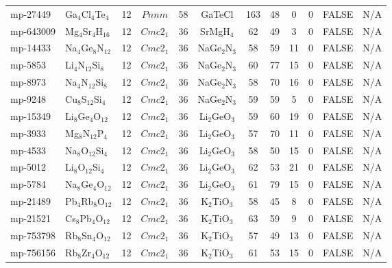 {\begin{longtable}{llcccccccccc}
    mp-27449 & Ga$_{4}$Cl$_{4}$Te$_{4}$ & 12    & $Pnnm$ & 58    & GaTeCl & 163   & 48    & 0     & 0     & FALSE & N/A \\
    mp-643009 & Mg$_{4}$Sr$_{4}$H$_{16}$ & 12    & $Cmc2_1$ & 36    & SrMgH$_{4}$ & 62    & 49    & 3     & 0     & FALSE & N/A \\
    mp-14433 & Na$_{4}$Ge$_{8}$N$_{12}$ & 12    & $Cmc2_1$ & 36    & NaGe$_{2}$N$_{3}$ & 58    & 59    & 11    & 0     & FALSE & N/A \\
    mp-5853 & Li$_{4}$N$_{12}$Si$_{8}$ & 12    & $Cmc2_1$ & 36    & NaGe$_{2}$N$_{3}$ & 60    & 77    & 15    & 0     & FALSE & N/A \\
    mp-8973 & Na$_{4}$N$_{12}$Si$_{8}$ & 12    & $Cmc2_1$ & 36    & NaGe$_{2}$N$_{3}$ & 58    & 70    & 16    & 0     & FALSE & N/A \\
    mp-9248 & Cu$_{8}$S$_{12}$Si$_{4}$ & 12    & $Cmc2_1$ & 36    & NaGe$_{2}$N$_{3}$ & 59    & 59    & 5     & 0     & FALSE & N/A \\
    mp-15349 & Li$_{8}$Ge$_{4}$O$_{12}$ & 12    & $Cmc2_1$ & 36    & Li$_{2}$GeO$_{3}$ & 59    & 60    & 19    & 0     & FALSE & N/A \\
    mp-3933 & Mg$_{8}$N$_{12}$P$_{4}$ & 12    & $Cmc2_1$ & 36    & Li$_{2}$GeO$_{3}$ & 57    & 70    & 11    & 0     & FALSE & N/A \\
    mp-4533 & Na$_{8}$O$_{12}$Si$_{4}$ & 12    & $Cmc2_1$ & 36    & Li$_{2}$GeO$_{3}$ & 58    & 50    & 15    & 0     & FALSE & N/A \\
    mp-5012 & Li$_{8}$O$_{12}$Si$_{4}$ & 12    & $Cmc2_1$ & 36    & Li$_{2}$GeO$_{3}$ & 62    & 53    & 21    & 0     & FALSE & N/A \\
    mp-5784 & Na$_{8}$Ge$_{4}$O$_{12}$ & 12    & $Cmc2_1$ & 36    & Li$_{2}$GeO$_{3}$ & 61    & 79    & 15    & 0     & FALSE & N/A \\
    mp-21489 & Pb$_{4}$Rb$_{8}$O$_{12}$ & 12    & $Cmc2_1$ & 36    & K$_{2}$TiO$_{3}$ & 58    & 45    & 8     & 0     & FALSE & N/A \\
    mp-21521 & Cs$_{8}$Pb$_{4}$O$_{12}$ & 12    & $Cmc2_1$ & 36    & K$_{2}$TiO$_{3}$ & 63    & 59    & 9     & 0     & FALSE & N/A \\
    mp-753798 & Rb$_{8}$Sn$_{4}$O$_{12}$ & 12    & $Cmc2_1$ & 36    & K$_{2}$TiO$_{3}$ & 57    & 49    & 13    & 0     & FALSE & N/A \\
    mp-756156 & Rb$_{8}$Zr$_{4}$O$_{12}$ & 12    & $Cmc2_1$ & 36    & K$_{2}$TiO$_{3}$ & 61    & 53    & 15    & 0     & FALSE & N/A \\

\end{longtable}}
